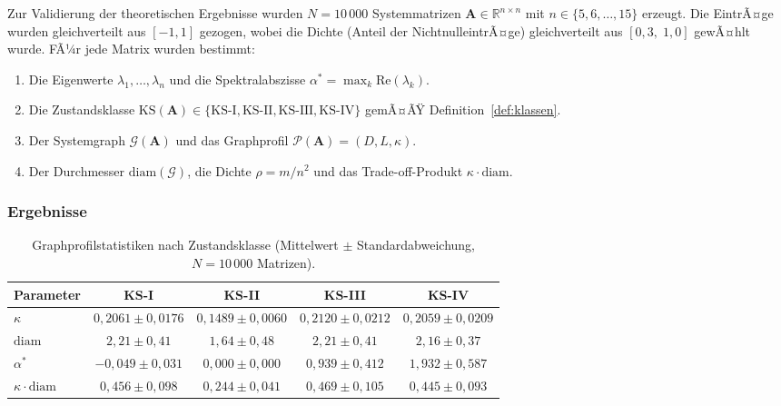 ﻿\documentclass[12pt, a4paper, titlepage]{report}
\theoremstyle{definition}
\theoremstyle{remark}
\newcommand{\R}{\mathbb{R}}
\newcommand{\vA}{\bm{A}}
\newcommand{\re}{\mathrm{Re}}
\newcommand{\KS}{\mathrm{KS}}
\begin{document}
Zur Validierung der theoretischen Ergebnisse wurden $N = 10\,000$ Systemmatrizen
$\vA \in \R^{n \times n}$ mit $n \in \{5, 6, \ldots, 15\}$ erzeugt. Die EintrÃ¤ge
wurden gleichverteilt aus $[-1, 1]$ gezogen, wobei die Dichte (Anteil der
NichtnulleintrÃ¤ge) gleichverteilt aus $[0{,}3,\; 1{,}0]$ gewÃ¤hlt wurde.
FÃ¼r jede Matrix wurden bestimmt:
\begin{enumerate}[label=(\alph*)]
  \item Die Eigenwerte $\lambda_1, \ldots, \lambda_n$ und die Spektralabszisse
    $\alpha^* = \max_k \re(\lambda_k)$.
  \item Die Zustandsklasse $\KS(\vA) \in \{\text{KS-I}, \text{KS-II}, \text{KS-III},
    \text{KS-IV}\}$ gemÃ¤ÃŸ Definition~\ref{def:klassen}.
  \item Der Systemgraph $\mathcal{G}(\vA)$ und das Graphprofil
    $\mathcal{P}(\vA) = (D, L, \kappa)$.
  \item Der Durchmesser $\mathrm{diam}(\mathcal{G})$, die Dichte
    $\rho = m / n^2$ und das Trade-off-Produkt $\kappa \cdot \mathrm{diam}$.
\end{enumerate}

\subsubsection{Ergebnisse}

\begin{table}[H]
\centering
\caption{Graphprofilstatistiken nach Zustandsklasse (Mittelwert $\pm$ Standardabweichung,
  $N = 10\,000$ Matrizen).}
\label{tab:gpv_statistiken}
\begin{tabular}{lcccc}
\toprule
\textbf{Parameter} & \textbf{KS-I} & \textbf{KS-II} & \textbf{KS-III} & \textbf{KS-IV} \\
\midrule
$\kappa$ & $0{,}2061 \pm 0{,}0176$ & $0{,}1489 \pm 0{,}0060$ & $0{,}2120 \pm 0{,}0212$ & $0{,}2059 \pm 0{,}0209$ \\
$\mathrm{diam}$ & $2{,}21 \pm 0{,}41$ & $1{,}64 \pm 0{,}48$ & $2{,}21 \pm 0{,}41$ & $2{,}16 \pm 0{,}37$ \\
$\alpha^*$ & $-0{,}049 \pm 0{,}031$ & $0{,}000 \pm 0{,}000$ & $0{,}939 \pm 0{,}412$ & $1{,}932 \pm 0{,}587$ \\
$\kappa \cdot \mathrm{diam}$ & $0{,}456 \pm 0{,}098$ & $0{,}244 \pm 0{,}041$ & $0{,}469 \pm 0{,}105$ & $0{,}445 \pm 0{,}093$ \\
\bottomrule
\end{tabular}
\end{table}
\end{document}
